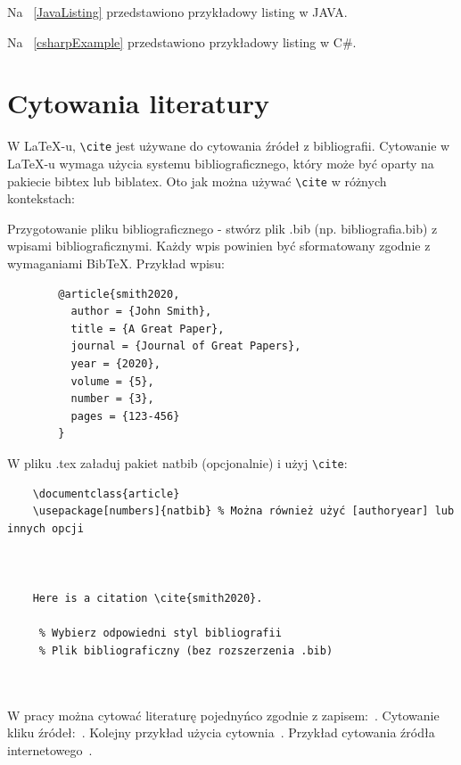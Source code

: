 

Na \listingname~\ref{JavaListing} przedstawiono przykładowy listing w JAVA.



Na \listingname~\ref{csharpExample} przedstawiono przykładowy listing w C\#.





\section{Cytowania literatury}

W LaTeX-u, \texttt{\textbackslash cite} jest używane do cytowania źródeł z bibliografii. Cytowanie w LaTeX-u wymaga użycia systemu bibliograficznego, który może być oparty na pakiecie bibtex lub biblatex. Oto jak można używać \texttt{\textbackslash cite} w różnych kontekstach:

Przygotowanie pliku bibliograficznego - stwórz plik .bib (np. bibliografia.bib) z wpisami bibliograficznymi. Każdy wpis powinien być sformatowany zgodnie z wymaganiami BibTeX. Przykład wpisu:
\begin{verbatim}
        @article{smith2020,
          author = {John Smith},
          title = {A Great Paper},
          journal = {Journal of Great Papers},
          year = {2020},
          volume = {5},
          number = {3},
          pages = {123-456}
        }
        \end{verbatim}

W pliku .tex załaduj pakiet natbib (opcjonalnie) i użyj \texttt{\textbackslash cite}:

\begin{verbatim}
    \documentclass{article}
    \usepackage[numbers]{natbib} % Można również użyć [authoryear] lub innych opcji

    

    Here is a citation \cite{smith2020}.

     % Wybierz odpowiedni styl bibliografii
     % Plik bibliograficzny (bez rozszerzenia .bib)

    

\end{verbatim}



W pracy można cytować literaturę pojednyńco zgodnie z zapisem:~\cite{ARM06}. Cytowanie kliku źródeł:~\cite{ARM06,BuDo03,BuDoVa03,PeDa04}. Kolejny przykład użycia cytownia~\cite{Dil00,Lam92}. Przykład cytowania źródła internetowego~\cite{example2024}.

